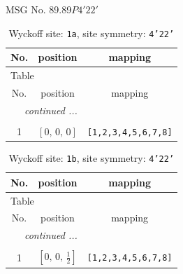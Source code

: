 \documentclass[fleqn,8pt]{jsarticle}
\begin{document}
\setcounter{MaxMatrixCols}{32}

\renewcommand{\tablename}{Table~}
\renewcommand{\figurename}{Figure~}
\begin{center}
\LARGE
MSG No. 89.89\quad$P4'22'$
\end{center}
\renewcommand{\arraystretch}{1.2}
\begin{longtable}{ccc}
\caption{Wyckoff site: {\tt 1a}, site symmetry: {\tt 4'22'}}
 \\
 \hline \hline
No. & position & mapping \\ \hline \endfirsthead

\multicolumn{2}{l}{\tablename\ \thetable{}} \\
 \hline \hline
No. & position & mapping \\ \hline \endhead

 \hline \hline
\multicolumn{2}{r}{\footnotesize\it continued ...} \\ \endfoot

 \hline \hline
\multicolumn{2}{r}{} \\ \endlastfoot

1 & $\left[ 0,\, 0,\, 0 \right]$ & {\tt [1,2,3,4,5,6,7,8]} \\
\end{longtable}
\renewcommand{\arraystretch}{1.2}
\begin{longtable}{ccc}
\caption{Wyckoff site: {\tt 1b}, site symmetry: {\tt 4'22'}}
 \\
 \hline \hline
No. & position & mapping \\ \hline \endfirsthead

\multicolumn{2}{l}{\tablename\ \thetable{}} \\
 \hline \hline
No. & position & mapping \\ \hline \endhead

 \hline \hline
\multicolumn{2}{r}{\footnotesize\it continued ...} \\ \endfoot

 \hline \hline
\multicolumn{2}{r}{} \\ \endlastfoot

1 & $\left[ 0,\, 0,\, \frac{1}{2} \right]$ & {\tt [1,2,3,4,5,6,7,8]} \\
\end{longtable}
\renewcommand{\arraystretch}{1.2}
\end{document}
